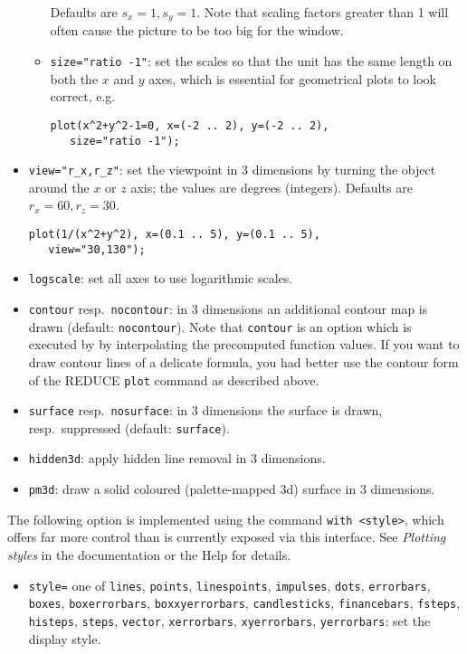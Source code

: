 \begin{itemize}
\begin{itemize}
      Defaults are $s_x=1,s_y=1$.  Note that scaling factors greater
      than 1 will often cause the picture to be too big for the
      window.
    \item \texttt{size="ratio -1"}: set the scales so that the unit
      has the same length on both the $x$ and $y$ axes, which is
      essential for geometrical plots to look correct, e.g.
\begin{verbatim}
plot(x^2+y^2-1=0, x=(-2 .. 2), y=(-2 .. 2),
   size="ratio -1");
\end{verbatim}
    \end{itemize}
  \item \texttt{view="r\_x,r\_z"}: set the viewpoint in 3 dimensions by turning
    the object around the $x$ or $z$ axis; the values are degrees (integers).
    Defaults are $r_x=60,r_z=30$.
\begin{verbatim}
plot(1/(x^2+y^2), x=(0.1 .. 5), y=(0.1 .. 5),
   view="30,130");
\end{verbatim}
  \item \texttt{logscale}: set all axes to use logarithmic scales.
  \item \texttt{contour} resp.\ \texttt{nocontour}: in 3 dimensions an
    additional contour map is drawn (default: \texttt{nocontour}).
    Note that \texttt{contour} is an option which is executed by
    {\Gnuplot} by interpolating the precomputed function values.  If
    you want to draw contour lines of a delicate formula, you had
    better use the contour form of the REDUCE \texttt{plot} command as
    described above.
  \item \texttt{surface} resp.\ \texttt{nosurface}: in 3 dimensions the surface
    is drawn, resp.\ suppressed (default: \texttt{surface}).
  \item \texttt{hidden3d}: apply hidden line removal in 3 dimensions.
  \item \texttt{pm3d}: draw a solid coloured (palette-mapped 3d)
    surface in 3 dimensions.
\end{itemize}

The following option is implemented using the {\Gnuplot} command
\texttt{with <style>}, which offers far more control than is currently
exposed via this interface.  See \emph{Plotting styles} in the
{\Gnuplot} documentation or the {\Gnuplot} Help for details.
\begin{itemize}
\item
  \begin{sloppypar}
    \texttt{style=} one of \texttt{lines}, \texttt{points},
    \texttt{linespoints}, \texttt{impulses}, \texttt{dots},
    \texttt{errorbars}, \texttt{boxes}, \texttt{boxerrorbars},
    \texttt{boxxyerrorbars}, \texttt{candlesticks},
    \texttt{financebars}, \texttt{fsteps}, \texttt{histeps},
    \texttt{steps}, \texttt{vector}, \texttt{xerrorbars},
    \texttt{xyerrorbars}, \texttt{yerrorbars}: set the display style.
  \end{sloppypar}
\end{itemize}


